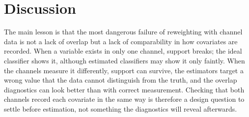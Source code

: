 \section{Discussion}\label{sec:discussion}

The main lesson is that the most dangerous failure of reweighting with channel data is not a lack of overlap but a lack of comparability in how covariates are recorded. When a variable exists in only one channel, support breaks; the ideal classifier shows it, although estimated classifiers may show it only faintly. When the channels measure it differently, support can survive, the estimators target a wrong value that the data cannot distinguish from the truth, and the overlap diagnostics can look better than with correct measurement. Checking that both channels record each covariate in the same way is therefore a design question to settle before estimation, not something the diagnostics will reveal afterwards.


